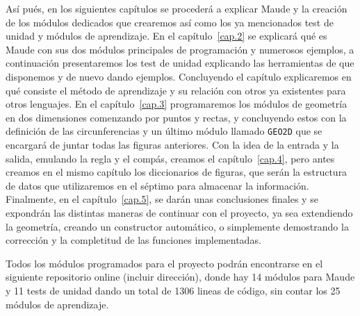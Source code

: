 Así pués, en los siguientes capítulos se procederá a explicar Maude y la creación de los módulos dedicados que crearemos así como los ya mencionados test de unidad y módulos de aprendizaje. En el capítulo~\ref{cap.2} se explicará qué es Maude con sus dos módulos principales de programación y numerosos ejemplos, a continuación presentaremos los test de unidad explicando las herramientas de que disponemos y de nuevo dando ejemplos. Concluyendo el capítulo explicaremos en qué consiste el método de aprendizaje y su relación con otros ya existentes para otros lenguajes. En el capítulo~\ref{cap.3} programaremos los módulos de geometría en dos dimensiones comenzando por puntos y rectas, y concluyendo estos con la definición de las circunferencias y un último módulo llamado \texttt{GEO2D} que se encargará de juntar todas las figuras anteriores. Con la idea de la entrada y la salida, emulando la regla y el compás, creamos el capítulo~\ref{cap.4}, pero antes creamos en el mismo capítulo los diccionarios de figuras, que serán la estructura de datos que utilizaremos en el séptimo para almacenar la información. Finalmente, en el capítulo~\ref{cap.5}, se darán unas conclusiones finales y se expondrán las distintas maneras de continuar con el proyecto, ya sea extendiendo la geometría, creando un constructor automático, o simplemente demostrando la corrección y la completitud de las funciones implementadas.\par

Todos los módulos programados para el proyecto podrán encontrarse en el siguiente repositorio online (incluir dirección), donde hay 14 módulos para Maude y 11 tests de unidad dando un total de 1306 lineas de código, sin contar los 25 módulos de aprendizaje. %
